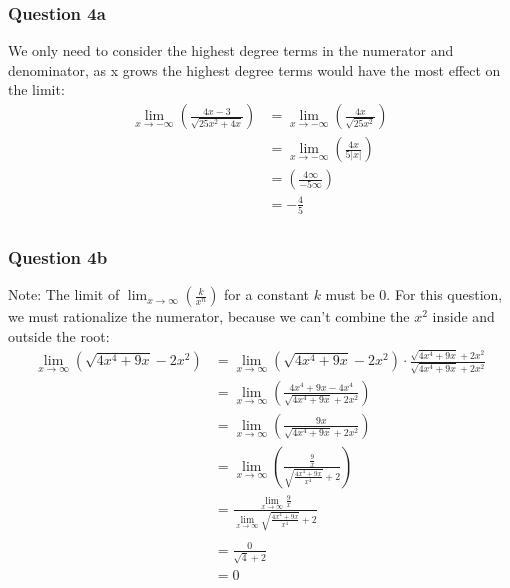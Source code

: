 \documentclass{article}
\begin{document}
\subsubsection*{Question 4a}
We only need to consider the highest degree terms in the numerator and denominator, as x grows the highest degree terms would have the most effect on the limit:
\begin{align*}
    \lim_{x\to -\infty}(\frac{4x-3}{\sqrt{25x^2+4x}}) & = \lim_{x\to -\infty}(\frac{4x}{\sqrt{25x^2}}) \\
                                                      & = \lim_{x\to -\infty}(\frac{4x}{5|x|})         \\
                                                      & = (\frac{4\infty}{-5\infty})                   \\
                                                      & = -\frac{4}{5}                                 \\
\end{align*}

\subsubsection*{Question 4b}
Note: The limit of $\lim_{x\to \infty}(\frac{k}{x^n})$ for a constant $k$ must be $0$.
For this question, we must rationalize the numerator, because we can't combine the $x^2$ inside and outside the root:
\begin{align*}
    \lim_{x\to \infty}(\sqrt{4x^4+9x}-2x^2) & = \lim_{x\to \infty}(\sqrt{4x^4+9x}-2x^2)\cdot\frac{\sqrt{4x^4+9x}+2x^2}{\sqrt{4x^4+9x}+2x^2} \\
                                            & = \lim_{x\to \infty}(\frac{4x^4+9x-4x^4}{\sqrt{4x^4+9x}+2x^2})                                \\
                                            & = \lim_{x\to \infty}(\frac{9x}{\sqrt{4x^4+9x}+2x^2})                                          \\
                                            & = \lim_{x\to \infty}(\frac{\frac{9}{x}}{\sqrt{\frac{4x^4+9x}{x^4}}+2})                        \\
                                            & = \frac{\lim_{x\to \infty}\frac{9}{x}}{\lim_{x\to \infty}\sqrt{\frac{4x^4+9x}{x^4}}+2}        \\                                                                                     \\
                                            & = \frac{0}{\sqrt{4}+2}                                                                        \\
                                            & = 0                                                                                           \\
\end{align*}
\end{document}

